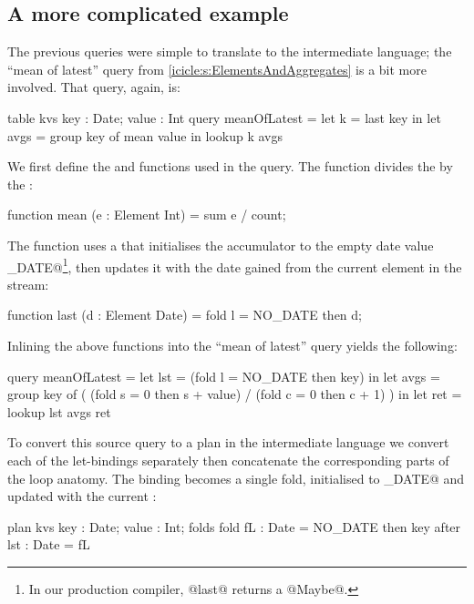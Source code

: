 \subsection{A more complicated example}

The previous queries were simple to translate to the intermediate language; the ``mean of latest'' query from \cref{icicle:s:ElementsAndAggregates} is a bit more involved.
That query, again, is:

\begin{icicle}
  table kvs { key : Date; value : Int } 
  query meanOfLatest
   = let k    = last  key in
     let avgs = group key of mean value in
     lookup k avgs
\end{icicle}

We first define the \IcC@mean@ and \IcC@last@ functions used in the query.
The \IcC@mean@ function divides the \IcC@sum@ by the \IcC@count@:
\begin{icicle}
function mean (e : Element Int)
 = sum e / count;
\end{icicle}

The \IcC@last@ function uses a \IcC@fold@ that initialises the accumulator to the empty date value \IcC@NO_DATE@\footnote{In our production compiler, @last@ returns a @Maybe@.}, then updates it with the date gained from the current element in the stream:
\begin{icicle}
function last (d : Element Date)
 = fold l = NO_DATE then d;
\end{icicle}



Inlining the above functions into the ``mean of latest'' query yields the following:
\begin{icicle}
query meanOfLatest
 = let lst  = (fold l = NO_DATE then key) in
   let avgs = group key of
              ( (fold s = 0 then s + value)
              / (fold c = 0 then c + 1) ) in
   let ret  = lookup lst avgs
   ret
\end{icicle}

To convert this source query to a plan in the intermediate language we convert each of the let-bindings separately then concatenate the corresponding parts of the loop anatomy.
The \IcC@lst@ binding becomes a single fold, initialised to \IcC@NO_DATE@ and updated with the current \IcC@key@:
\begin{icicle-core}
plan kvs {      key : Date; value : Int;       }
folds    { fold fL  : Date = NO_DATE then key  }
after    {      lst : Date = fL                }
\end{icicle-core}

